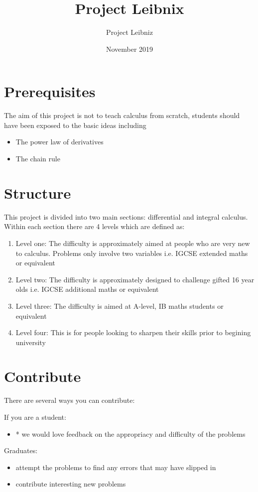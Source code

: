 \documentclass{article}
\title{Project Leibnix}
\author{Project Leibniz}
\date{November 2019}
\begin{document}


\section{Prerequisites}

The aim of this project is not to teach calculus from scratch, students should
have been exposed to the basic ideas including

\begin{itemize}
	\item The power law of derivatives
	\item The chain rule
\end{itemize}

\section{Structure}

This project is divided into two main sections: differential and integral calculus. Within each section there are 4 levels which are defined as:

\begin{enumerate}
	\item Level one: The difficulty is approximately aimed at people who
	are very new to calculus. Problems only involve two variables i.e. IGCSE
	extended maths or equivalent
	\item Level two: The difficulty is approximately designed to challenge
	gifted 16 year olds i.e. IGCSE additional maths or equivalent
	\item Level three: The difficulty is aimed at A-level, IB maths
	students or equivalent
	\item Level four: This is for people looking to sharpen their skills
	prior to begining university
\end{enumerate}

\section{Contribute}

There are several ways you can contribute:

If you are a student:
\begin{itemize}
	\item * we would love feedback on the appropriacy and difficulty of the problems
\end{itemize}

Graduates:
\begin{itemize}
	\item attempt the problems to find any errors that may have slipped in
	\item contribute interesting new problems
\end{itemize}
\end{document}
